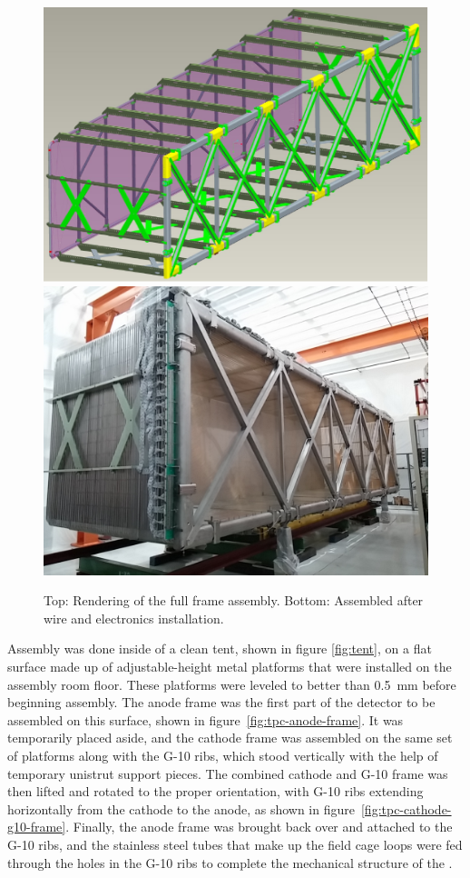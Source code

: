 \begin{figure}[htb]
\centering	
\includegraphics[width=0.8\linewidth]{figures/tpc-3drendering.pdf}
\includegraphics[width=0.8\linewidth]{figures/tpc-completed-upstream-right.jpg}
\caption{Top: Rendering of the full \lartpc frame assembly.  Bottom: Assembled \lartpc after wire and electronics installation.}
\label{fig:tpc-full}
\end{figure}

Assembly was done inside of a clean tent, shown in figure \ref{fig:tent}, on a flat surface made up of adjustable-height metal platforms that were installed on the assembly room floor.  These platforms were leveled to better than 0.5~mm before beginning assembly.  The anode frame was the first part of the detector to be assembled on this surface, shown in figure~\ref{fig:tpc-anode-frame}. It was temporarily placed aside, and the cathode frame was assembled on the same set of platforms along with the G-10 ribs, which stood vertically with the help of temporary unistrut support pieces.  The combined cathode and G-10 frame was then lifted and rotated to the proper orientation, with G-10 ribs extending horizontally from the cathode to the anode, as shown in figure~\ref{fig:tpc-cathode-g10-frame}. Finally, the anode frame was brought back over and attached to the G-10 ribs, and the stainless steel tubes that make up the field cage loops were fed through the holes in the G-10 ribs to complete the mechanical structure of the \lartpc. 


